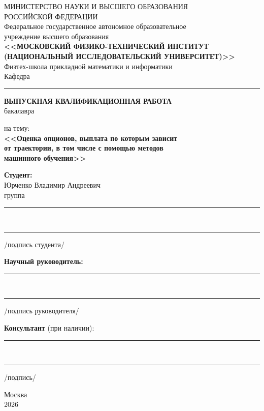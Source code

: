 \begin{titlepage}
  \begin{center}
    \singlespacing
    {\small
      МИНИСТЕРСТВО НАУКИ И ВЫСШЕГО ОБРАЗОВАНИЯ\\
      РОССИЙСКОЙ ФЕДЕРАЦИИ\\[0.2em]
      Федеральное государственное автономное образовательное\\
      учреждение высшего образования\\[0.2em]
      \textbf{<<МОСКОВСКИЙ ФИЗИКО-ТЕХНИЧЕСКИЙ ИНСТИТУТ\\
      (НАЦИОНАЛЬНЫЙ ИССЛЕДОВАТЕЛЬСКИЙ УНИВЕРСИТЕТ)>>}\\[0.6em]
      Физтех-школа прикладной математики и информатики\\[0.2em]
      Кафедра \rule{6cm}{0.4pt}\quad %
    }

    \vspace{2.2cm}

    {\large \textbf{ВЫПУСКНАЯ КВАЛИФИКАЦИОННАЯ РАБОТА}}\\[0.3em]
    {\normalsize бакалавра}

    \vspace{1.6cm}

    {\large на тему:}\\[0.6em]
    {\Large\textbf{<<Оценка опционов, выплата по которым зависит\\
    от траектории, в том числе с помощью методов\\
    машинного обучения>>}}

    \vspace{1.8cm}

    \begin{flushleft}
      \hspace*{0.45\linewidth}%
      \begin{minipage}{0.55\linewidth}
        \textbf{Студент:} \\[0.2em]
        Юрченко Владимир Андреевич\\
        группа \rule{4cm}{0.4pt}\\[0.3em]
        \rule{5cm}{0.4pt}\quad/подпись студента/

        \vspace{0.8cm}
        \textbf{Научный руководитель:}\\[0.2em]
        \rule{6cm}{0.4pt}\\
        \rule{6cm}{0.4pt}\quad %
        /подпись руководителя/

        \vspace{0.8cm}
        \textbf{Консультант} (при наличии):\\[0.2em]
        \rule{6cm}{0.4pt}\\
        \rule{5cm}{0.4pt}\quad/подпись/
      \end{minipage}
    \end{flushleft}

    \vfill
    {\normalsize Москва\\ 2026}
  \end{center}
\end{titlepage}
